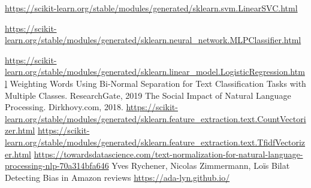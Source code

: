 \documentclass[twoside,twocolumn]{article}
\begin{document}
\begin{thebibliography}{99} %

	\url{https://scikit-learn.org/stable/modules/generated/sklearn.svm.LinearSVC.html}

	\url{https://scikit-learn.org/stable/modules/generated/sklearn.neural_network.MLPClassifier.html}

	\url{https://scikit-learn.org/stable/modules/generated/sklearn.linear_model.LogisticRegression.html}
	\newblock Weighting Words Using Bi-Normal Separation for Text Classification Tasks with Multiple Classes. ResearchGate, 2019
	\newblock The Social Impact of Natural Language Processing. Dirkhovy.com, 2018.
	\url{https://scikit-learn.org/stable/modules/generated/sklearn.feature_extraction.text.CountVectorizer.html}
	\url{https://scikit-learn.org/stable/modules/generated/sklearn.feature_extraction.text.TfidfVectorizer.html}
	\url{https://towardsdatascience.com/text-normalization-for-natural-language-processing-nlp-70a314bfa646}
	Yves Rychener, Nicolas Zimmermann, Loïs Bilat
	\newblock Detecting Bias in Amazon reviews
	\url{https://ada-lyn.github.io/}
\end{thebibliography}

\end{document}
